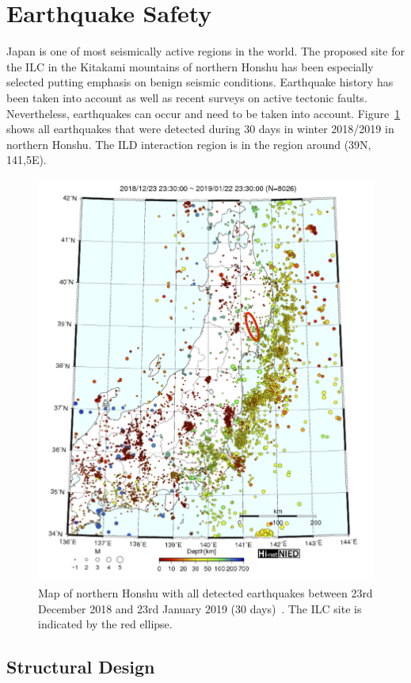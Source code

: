 \section{Earthquake Safety}
\label{ild:sec:earthquake}
Japan is one of most seismically active regions in the world. The proposed site for the ILC in the Kitakami mountains of northern Honshu has been especially selected putting emphasis on benign seismic conditions. Earthquake history has been taken into account as well as recent surveys on active tectonic faults. Nevertheless, earthquakes can occur and need to be taken into account. Figure~\ref{ild:fig:integration:earthquake_map} shows all earthquakes that were detected during 30 days in winter 2018/2019 in northern Honshu. The ILD interaction region is in the region around (39N, 141,5E).

\begin{figure}[h!]
\centering
\includegraphics[width=0.8\hsize]{Integration/fig/earthquake_map.png}

\caption{\label{ild:fig:integration:earthquake_map}Map of northern Honshu with all detected earthquakes between 23rd December 2018 and 23rd January 2019 (30 days)~\cite{ild:bib:hi-net}. The ILC site is indicated by the red ellipse.}
\end{figure}

\subsection{Structural Design}


